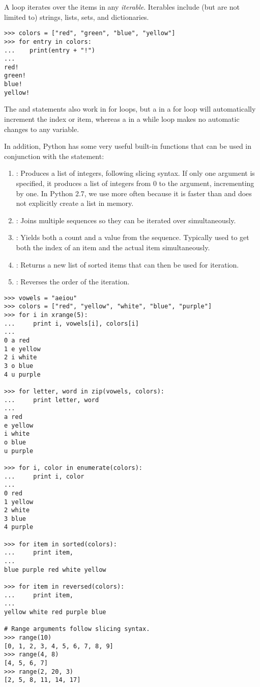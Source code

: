 A  loop iterates over the items in any \emph{iterable}.
Iterables include (but are not limited to) strings, lists, sets, and dictionaries.

\begin{lstlisting}
>>> colors = ["red", "green", "blue", "yellow"]
>>> for entry in colors:
...    print(entry + "!")
...
red!
green!
blue!
yellow!
\end{lstlisting}

The  and  statements also work in for loops, but a  in a for loop will automatically increment the index or item, whereas a  in a while loop makes no automatic changes to any variable.

In addition, Python has some very useful built-in functions that can be used in conjunction with the  statement:
\begin{enumerate}
\item {}: Produces a list of integers, following slicing syntax. If only one argument is specified, it produces a list of integers from 0 to the argument, incrementing by one.
In Python 2.7, we use  more often because it is faster than  and does not explicitly create a list in memory.
\item {}: Joins multiple sequences so they can be iterated over simultaneously.
\item {}: Yields both a count and a value from the sequence. Typically used to get both the index of an item and the actual item simultaneously.
\item {}: Returns a new list of sorted items that can then be used for iteration.
\item {}: Reverses the order of the iteration.
\end{enumerate}

\begin{lstlisting}
>>> vowels = "aeiou"
>>> colors = ["red", "yellow", "white", "blue", "purple"]
>>> for i in xrange(5):
...     print i, vowels[i], colors[i]
... 
0 a red
1 e yellow
2 i white
3 o blue
4 u purple

>>> for letter, word in zip(vowels, colors):
...     print letter, word
... 
a red
e yellow
i white
o blue
u purple

>>> for i, color in enumerate(colors):
...     print i, color
... 
0 red
1 yellow
2 white
3 blue
4 purple

>>> for item in sorted(colors):
...     print item,
...
blue purple red white yellow

>>> for item in reversed(colors):
...     print item,
...
yellow white red purple blue

# Range arguments follow slicing syntax.
>>> range(10)
[0, 1, 2, 3, 4, 5, 6, 7, 8, 9]
>>> range(4, 8)
[4, 5, 6, 7]
>>> range(2, 20, 3)
[2, 5, 8, 11, 14, 17]
\end{lstlisting}

